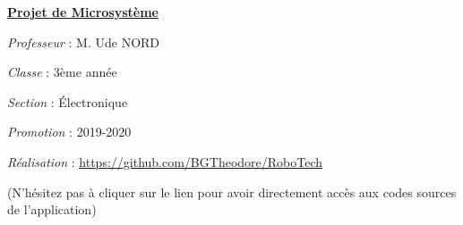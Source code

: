 \documentclass[a4paper,12pt]{report}
\begin{document}
\begin{center}
    \textbf{\underline{Projet de Microsystème}} \par 
    \textit{Professeur} : M. Ude NORD \par 
    \textit{Classe} : 3ème année \par 
    \textit{Section} : Électronique \par 
    \textit{Promotion} : 2019-2020 \par 
    \textit{Réalisation} : \url{https://github.com/BGTheodore/RoboTech}\par 
    (N'hésitez pas à cliquer sur le lien pour avoir directement accès aux codes 
    sources de l'application)
\end{center}


\tableofcontents


















\end{document}
